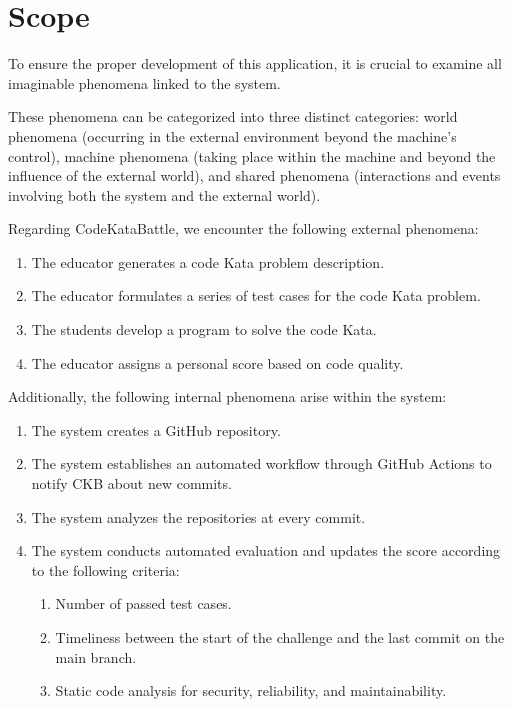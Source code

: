 \documentclass[12pt, a4paper]{report}
\begin{document}
    \section{Scope}
    To ensure the proper development of this application, it is crucial to examine all imaginable phenomena linked to the system.
    
    These phenomena can be categorized into three distinct categories: world phenomena (occurring in the external environment beyond the machine's control), machine 
    phenomena (taking place within the machine and beyond the influence of the external world), and shared phenomena (interactions and events involving both the system
    and the external world).

    Regarding CodeKataBattle, we encounter the following external phenomena: 
    \begin{enumerate}
        \item The educator generates a code Kata problem description.
        \item The educator formulates a series of test cases for the code Kata problem.
        \item The students develop a program to solve the code Kata.
        \item The educator assigns a personal score based on code quality.
    \end{enumerate}
    Additionally, the following internal phenomena arise within the system: 
    \begin{enumerate}
        \item The system creates a GitHub repository.
        \item The system establishes an automated workflow through GitHub Actions to notify CKB about new commits.
        \item The system analyzes the repositories at every commit.
        \item The system conducts automated evaluation and updates the score according to the following criteria:
            \begin{enumerate}
                \item Number of passed test cases.
                \item Timeliness between the start of the challenge and the last commit on the main branch.
                \item Static code analysis for security, reliability, and maintainability.
            \end{enumerate}
    \end{enumerate}    
\end{document}
